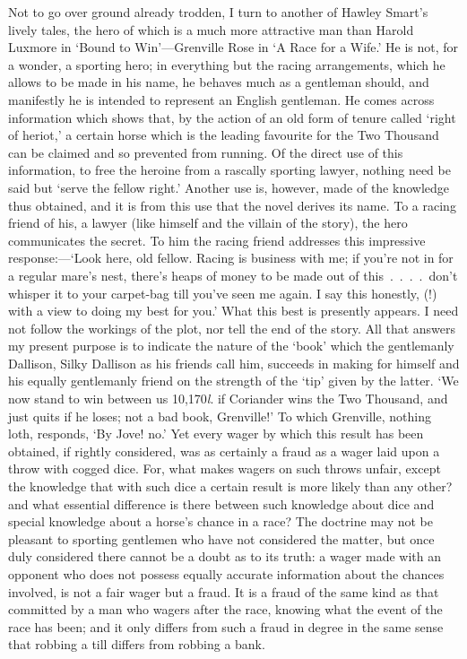 \documentclass[letterpaper,12pt,oneside,openany]{memoir}
\begin{document}
Not to go over ground already trodden, I turn to
another of Hawley Smart's lively tales, the hero of
which is a much more attractive man than Harold
Luxmore in `Bound to Win'---Grenville Rose in `A
Race for a Wife.' He is not, for a wonder, a sporting
hero; in everything but the racing arrangements,
which he allows to be made in his name, he behaves
much as a gentleman should, and manifestly he is
intended to represent an English gentleman. He comes
across information which shows that, by the action of
an old form of tenure called `right of heriot,' a certain
horse which is the leading favourite for the Two Thousand
can be claimed and so prevented from running.
Of the direct use of this information, to free the heroine
from a rascally sporting lawyer, nothing need be said
but `serve the fellow right.' Another use is, however,
made of the knowledge thus obtained, and it is from
this use that the novel derives its name. To a racing
friend of his, a lawyer (like himself and the villain of
the story), the hero communicates the secret. To him
the racing friend addresses this impressive response:---`Look
here, old fellow. Racing is business with me;
if you're not in for a regular mare's nest, there's heaps
of money to be made out of this~.~.~.~.~don't whisper
it to your carpet-bag till you've seen me again. I say
this honestly, (!) with a view to doing my best for you.'
What this best is presently appears. I need not follow
the workings of the plot, nor tell the end of the story.
All that answers my present purpose is to indicate the
nature of the `book' which the gentlemanly Dallison,
Silky Dallison as his friends call him, succeeds in
making for himself and his equally gentlemanly friend
on the strength of the `tip' given by the latter. `We
now stand to win between us 10,170\textit{l}. if Coriander wins
the Two Thousand, and just quits if he loses; not a
bad book, Grenville!' To which Grenville, nothing
loth, responds, `By Jove! no.' Yet every wager by
which this result has been obtained, if rightly considered,
was as certainly a fraud as a wager laid upon a
throw with cogged dice. For, what makes wagers on
such throws unfair, except the knowledge that with such
dice a certain result is more likely than any other? and
what essential difference is there between such knowledge
about dice and special knowledge about a horse's chance
in a race? The doctrine may not be pleasant to sporting
gentlemen who have not considered the matter, but once
duly considered there cannot be a doubt as to its truth:
a wager made with an opponent who does not possess
equally accurate information about the chances involved,
is not a fair wager but a fraud. It is a fraud of the same
kind as that committed by a man who wagers after the
race, knowing what the event of the race has been; and
it only differs from such a fraud in degree in the same
sense that robbing a till differs from robbing a bank.
\end{document}
